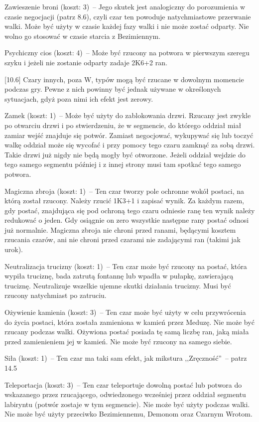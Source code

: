 Zawieszenie broni (koszt: 3)~-- Jego skutek jest analogiczny do porozumienia w czasie negocjacji (patrz 8.6), czyli czar ten powoduje natychmiastowe przerwanie walki.
Może być użyty w czasie każdej fazy walki i nie może zostać odparty.
Nie wolno go stosować w czasie starcia z Bezimiennym.

Psychiczny cios (koszt: 4)~-- Może być rzucony na potwora w pierwszym szeregu szyku i jeżeli nie zostanie odparty zadaje 2K6+2 ran.

[10.6] Czary innych, poza W, typów mogą być rzucane w dowolnym momencie podczas gry.
Pewne z nich powinny być jednak używane w określonych sytuacjach, gdyż poza nimi ich efekt jest zerowy.

Zamek (koszt: 1)~-- Może być użyty do zablokowania drzwi.
Rzucany jest zwykle po otwarciu drzwi i po stwierdzeniu, że w segmencie, do którego oddział miał zamiar wejść znajduje się potwór.
Zamiast negocjować, wykupywać się lub toczyć walkę oddział może się wycofać i przy pomocy tego czaru zamknąć za sobą drzwi.
Takie drzwi już nigdy nie będą mogły być otworzone.
Jeżeli oddział wejdzie do tego samego segmentu później i z innej strony musi tam spotkać tego samego potwora.

Magiczna zbroja (koszt: 1)~-- Ten czar tworzy pole ochronne wokół postaci, na którą został rzucony.
Należy rzucić 1K3+1 i zapisać wynik.
Za każdym razem, gdy postać, znajdująca się pod ochroną tego czaru odniesie ranę ten wynik należy redukować o jeden.
Gdy osiągnie on zero wszystkie następne rany postać odnosi już normalnie.
Magiczna zbroja nie chroni przed ranami, będącymi kosztem rzucania czarów, ani nie chroni przed czarami nie zadającymi ran (takimi jak urok).

Neutralizacja trucizny (koszt: 1)~-- Ten czar może być rzucony na postać, która wypiła truciznę, bada zatrutą fontannę lub wpadła w pułapkę, zawierającą truciznę.
Neutralizuje wszelkie ujemne skutki działania trucizny.
Musi być rzucony natychmiast po zatruciu.

Ożywienie kamienia (koszt: 3)~-- Ten czar może być użyty w celu przywrócenia do życia postaci, która została zamieniona w kamień przez Meduzę.
Nie może być rzucany podczas walki.
Ożywiona postać posiada tę samą liczbę ran, jaką miała przed zamienieniem jej w kamień.
Nie może być rzucony na samego siebie.

Siła (koszt: 1)~-- Ten czar ma taki sam efekt, jak mikstura ,,Zręczność''~-- patrz 14.5

Teleportacja (koszt: 3)~-- Ten czar teleportuje dowolną postać lub potwora do wskazanego przez rzucającego, odwiedzonego wcześniej przez oddział segmentu labiryntu (potwór zostaje w tym segmencie).
Nie może być użyty podczas walki.
Nie może być użyty przeciwko Bezimiennemu, Demonom oraz Czarnym Wrotom.

